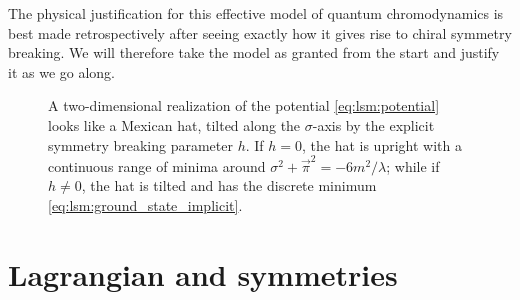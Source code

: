 The physical justification for this effective model of quantum chromodynamics is best made retrospectively after seeing exactly how it gives rise to chiral symmetry breaking.
We will therefore take the model as granted from the start and justify it as we go along.

\begin{figure}
\centering
{}
\caption{\label{fig:lsm:potential}%
	A two-dimensional realization of the potential \eqref{eq:lsm:potential} looks like a Mexican hat, tilted along the $\sigma$-axis by the explicit symmetry breaking parameter $h$.
	If $h = 0$, the hat is upright with a continuous range of minima around $\sigma^2 + \vec\pi^2 = -6m^2 / \lambda$;
	while if $h \neq 0$, the hat is tilted and has the discrete minimum \eqref{eq:lsm:ground_state_implicit}.
}
\end{figure}

\section{Lagrangian and symmetries}

